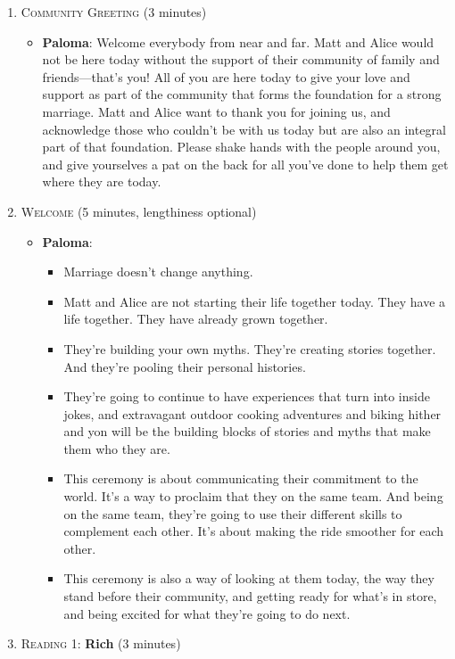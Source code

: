 \documentclass[12pt]{article}
\begin{document}
\begin{enumerate}
\item \textsc{Community Greeting} (3 minutes)
  \begin{itemize}
  \item {\bf Paloma}:  Welcome everybody from near and far. Matt and Alice  would not be here today without the support of their community  of family and friends---that's you! All of you are here today to give your love and support as part of the community that forms the foundation for a strong marriage. Matt and Alice want to thank you for joining us, and acknowledge those who couldn't be with us today but are also an integral part of that foundation. Please shake hands with the people around you, and give yourselves a pat on the back for all you've done to help them get where they are today. 
  \end{itemize}
\item \textsc{Welcome} (5 minutes, lengthiness optional)
  \begin{itemize}
  \item {\bf Paloma}:
    \begin{itemize}
    \item Marriage doesn't change anything.
    \item Matt and Alice are not starting their life together today. They have a life together. They have already grown together.
    \item They're building your own myths. They're creating stories together. And they're pooling their personal histories.
    \item They're going to continue to have experiences that turn into inside jokes, and extravagant outdoor cooking adventures and biking hither and yon will be the building blocks of stories and myths that make them who they are.
    \item This ceremony is about communicating their commitment to the world. It's a way to proclaim that they on the same team. And being on the same team, they're going to use their different skills to complement each other. It's about making the ride smoother for each other.
    \item This ceremony is also a way of looking at them today, the way they stand before their community, and getting ready for what's in store, and being excited for what they're going to do next.
    \end{itemize}
  \end{itemize}

\item \textsc{Reading 1}: {\bf Rich} (3 minutes)


\end{enumerate}
\end{document}

